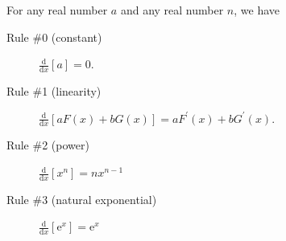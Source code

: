 \documentclass[12pt,fleqn]{exam}
\begin{document}
\begin{questions}
\end{questions}

\vfill

\noindent For any real number $a$ and any real number $n$, we have 
\begin{description}

\item[Rule \#0 (constant)] $ \displaystyle \frac{\mathrm{d}}{\mathrm{d} x} \left[a \right]  = 0 $.
 
\item[Rule \#1 (linearity)] $ \displaystyle \frac{\mathrm{d}}{\mathrm{d} x} \left[  a F(x) + b G(x)  \right] = a F^\prime(x) + b G^\prime(x) $.

\item [Rule \#2 (power)]  $   \displaystyle \frac{\mathrm{d}}{\mathrm{d} x} \left[ x^n \right]  = n x^{n-1}$

\item [Rule \#3 (natural exponential)]  $\displaystyle \frac{\mathrm{d}}{\mathrm{d} x} \left[ \mathrm{e}^x \right]  = 
\mathrm{e}^x $
\end{description}
\end{document}
